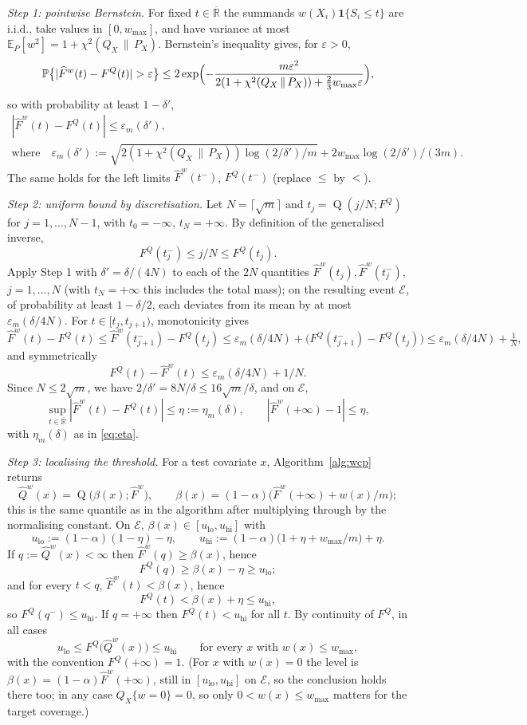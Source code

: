 \documentclass[11pt,a4paper]{article}
\newcommand{\PX}{P_X}
\newcommand{\QX}{Q_X}
\newcommand{\chisq}{\chi^2(\QX\,\|\,\PX)}
\newcommand{\abs}[1]{\left|#1\right|}
\newcommand{\E}{\mathbb{E}}
\newcommand{\Prob}{\mathbb{P}}
\newcommand{\Rbar}{\overline{\mathbb{R}}}
\newcommand{\ind}{\mathbf 1}
\DeclareMathOperator{\Qf}{Q}
\theoremstyle{plain}
\theoremstyle{definition}
\theoremstyle{remark}
\begin{document}
\emph{Step 1: pointwise Bernstein.} For fixed $t\in\Rbar$ the summands $w(X_i)\ind\{S_i\le t\}$ are i.i.d., take values in $[0,w_{\max}]$, and have variance at most $\E_P[w^2]=1+\chisq$. Bernstein's inequality gives, for $\varepsilon>0$,
\[
\Prob\bigl\{|\widehat F^w(t)-F^Q(t)|>\varepsilon\bigr\}\le2\exp\Bigl(-\frac{m\varepsilon^2}{2(1+\chisq)+\frac23w_{\max}\varepsilon}\Bigr),
\]
so with probability at least $1-\delta'$,
\begin{gather*}
|\widehat F^w(t)-F^Q(t)|\le\varepsilon_m(\delta'),\\
\text{where}\quad\varepsilon_m(\delta'):=\sqrt{2(1+\chisq)\log(2/\delta')/m}+2w_{\max}\log(2/\delta')/(3m).
\end{gather*}
The same holds for the left limits $\widehat F^w(t^-)$, $F^Q(t^-)$ (replace $\le$ by $<$).

\emph{Step 2: uniform bound by discretisation.} Let $N=\lceil\sqrt m\rceil$ and $t_j=\Qf(j/N;F^Q)$ for $j=1,\dots,N-1$, with $t_0=-\infty$, $t_N=+\infty$. By definition of the generalised inverse,
\[
F^Q(t_j^-)\le j/N\le F^Q(t_j).
\]
Apply Step 1 with $\delta'=\delta/(4N)$ to each of the $2N$ quantities $\widehat F^w(t_j),\widehat F^w(t_j^-)$, $j=1,\dots,N$ (with $t_N=+\infty$ this includes the total mass); on the resulting event $\mathcal E$, of probability at least $1-\delta/2$, each deviates from its mean by at most $\varepsilon_m(\delta/4N)$. For $t\in[t_j,t_{j+1})$, monotonicity gives
\[
\widehat F^w(t)-F^Q(t)\le\widehat F^w(t_{j+1}^-)-F^Q(t_j)\le\varepsilon_m(\delta/4N)+\bigl(F^Q(t_{j+1}^-)-F^Q(t_j)\bigr)\le\varepsilon_m(\delta/4N)+\tfrac1N,
\]
and symmetrically
\[
F^Q(t)-\widehat F^w(t)\le\varepsilon_m(\delta/4N)+1/N .
\]
Since $N\le2\sqrt m$, we have $2/\delta'=8N/\delta\le16\sqrt m/\delta$, and on $\mathcal E$,
\[
\sup_{t\in\Rbar}\abs{\widehat F^w(t)-F^Q(t)}\le\eta:=\eta_m(\delta),\qquad \abs{\widehat F^w(+\infty)-1}\le\eta ,
\]
with $\eta_m(\delta)$ as in \eqref{eq:eta}.

\emph{Step 3: localising the threshold.} For a test covariate $x$, Algorithm~\ref{alg:wcp} returns
\[
\widehat Q^w(x)=\Qf\bigl(\beta(x);\widehat F^w\bigr),\qquad \beta(x)=(1-\alpha)\bigl(\widehat F^w(+\infty)+w(x)/m\bigr);
\]
this is the same quantile as in the algorithm after multiplying through by the normalising constant. On $\mathcal E$, $\beta(x)\in[u_{\mathrm{lo}},u_{\mathrm{hi}}]$ with
\[
u_{\mathrm{lo}}:=(1-\alpha)(1-\eta)-\eta,\qquad u_{\mathrm{hi}}:=(1-\alpha)\bigl(1+\eta+w_{\max}/m\bigr)+\eta .
\]
If $q:=\widehat Q^w(x)<\infty$ then $\widehat F^w(q)\ge\beta(x)$, hence
\[
F^Q(q)\ge\beta(x)-\eta\ge u_{\mathrm{lo}};
\]
and for every $t<q$, $\widehat F^w(t)<\beta(x)$, hence
\[
F^Q(t)<\beta(x)+\eta\le u_{\mathrm{hi}},
\]
so $F^Q(q^-)\le u_{\mathrm{hi}}$. If $q=+\infty$ then $F^Q(t)<u_{\mathrm{hi}}$ for all $t$. By continuity of $F^Q$, in all cases
\[
u_{\mathrm{lo}}\le F^Q\bigl(\widehat Q^w(x)\bigr)\le u_{\mathrm{hi}}\qquad\text{for every }x\text{ with }w(x)\le w_{\max},
\]
with the convention $F^Q(+\infty)=1$. (For $x$ with $w(x)=0$ the level is $\beta(x)=(1-\alpha)\widehat F^w(+\infty)$, still in $[u_{\mathrm{lo}},u_{\mathrm{hi}}]$ on $\mathcal E$, so the conclusion holds there too; in any case $\QX\{w=0\}=0$, so only $0<w(x)\le w_{\max}$ matters for the target coverage.)
\end{document}
